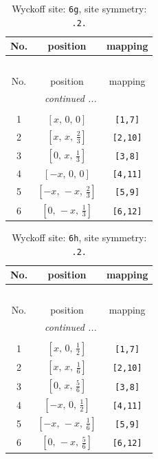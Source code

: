 \documentclass[fleqn,8pt]{jsarticle}
\begin{document}
\renewcommand{\arraystretch}{1.2}
\begin{longtable}{ccc}
\caption{Wyckoff site: {\tt 6g}, site symmetry: {\tt .2.}}
 \\
 \hline \hline
No. & position & mapping \\ \hline \endfirsthead

\multicolumn{2}{l}{\tablename\ \thetable{}} \\
 \hline \hline
No. & position & mapping \\ \hline \endhead

 \hline \hline
\multicolumn{2}{r}{\footnotesize\it continued ...} \\ \endfoot

 \hline \hline
\multicolumn{2}{r}{} \\ \endlastfoot

1 & $\left[ x,\, 0,\, 0 \right]$ & {\tt [1,7]} \\ \hline
2 & $\left[ x,\, x,\, \frac{2}{3} \right]$ & {\tt [2,10]} \\ \hline
3 & $\left[ 0,\, x,\, \frac{1}{3} \right]$ & {\tt [3,8]} \\ \hline
4 & $\left[ - x,\, 0,\, 0 \right]$ & {\tt [4,11]} \\ \hline
5 & $\left[ - x,\, - x,\, \frac{2}{3} \right]$ & {\tt [5,9]} \\ \hline
6 & $\left[ 0,\, - x,\, \frac{1}{3} \right]$ & {\tt [6,12]} \\
\end{longtable}
\renewcommand{\arraystretch}{1.2}
\begin{longtable}{ccc}
\caption{Wyckoff site: {\tt 6h}, site symmetry: {\tt .2.}}
 \\
 \hline \hline
No. & position & mapping \\ \hline \endfirsthead

\multicolumn{2}{l}{\tablename\ \thetable{}} \\
 \hline \hline
No. & position & mapping \\ \hline \endhead

 \hline \hline
\multicolumn{2}{r}{\footnotesize\it continued ...} \\ \endfoot

 \hline \hline
\multicolumn{2}{r}{} \\ \endlastfoot

1 & $\left[ x,\, 0,\, \frac{1}{2} \right]$ & {\tt [1,7]} \\ \hline
2 & $\left[ x,\, x,\, \frac{1}{6} \right]$ & {\tt [2,10]} \\ \hline
3 & $\left[ 0,\, x,\, \frac{5}{6} \right]$ & {\tt [3,8]} \\ \hline
4 & $\left[ - x,\, 0,\, \frac{1}{2} \right]$ & {\tt [4,11]} \\ \hline
5 & $\left[ - x,\, - x,\, \frac{1}{6} \right]$ & {\tt [5,9]} \\ \hline
6 & $\left[ 0,\, - x,\, \frac{5}{6} \right]$ & {\tt [6,12]} \\
\end{longtable}
\end{document}
